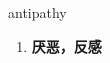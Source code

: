 
\begin{frame}
{\huge antipathy}
\begin{center}
\begin{enumerate}\Large
  \item \textbf{厌恶，反感}
\end{enumerate}
\end{center}
\end{frame}
